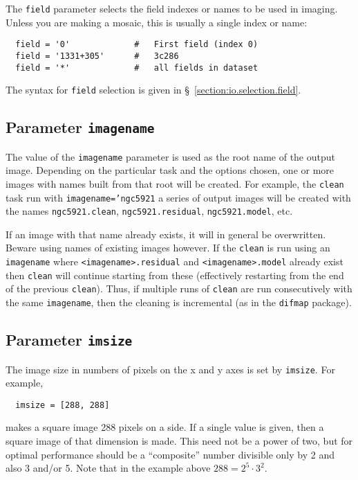 The {\tt field} parameter selects the field indexes or names
to be used in imaging.  Unless you are making a mosaic, this
is usually a single index or name:
\small
\begin{verbatim}
  field = '0'             #   First field (index 0)
  field = '1331+305'      #   3c286
  field = '*'             #   all fields in dataset
\end{verbatim}
\normalsize

The syntax for {\tt field} selection is given in 
\S~\ref{section:io.selection.field}.

\subsection{Parameter {\tt imagename} }
\label{section:im.pars.imagename}

The value of the {\tt imagename} parameter is used as the root name
of the output image.  Depending on the particular task and the
options chosen, one or more images with names built from that root
will be created.  
For example, the {\tt clean} task run with
{\tt imagename='ngc5921} 
a series of output images will be created with the names
{\tt ngc5921.clean}, {\tt ngc5921.residual}, {\tt ngc5921.model}, etc.

If an image with that name already exists, it will in general
be overwritten.  Beware using names of existing images however.
If the {\tt clean} is run using an {\tt imagename} where 
{\tt <imagename>.residual} and {\tt <imagename>.model} already
exist then {\tt clean} will continue starting from these
(effectively restarting from the end of the previous {\tt clean}). 
Thus, if multiple runs of {\tt clean} are run consecutively
with the same {\tt imagename}, then the cleaning is incremental
(as in the {\tt difmap} package).

\subsection{Parameter {\tt imsize} }
\label{section:im.pars.imsize}

The image size in numbers of pixels on the x and y axes is
set by {\tt imsize}.  For example,
\small
\begin{verbatim}
  imsize = [288, 288]
\end{verbatim}
\normalsize
makes a square image 288 pixels on a side.  If a single value
is given, then a square image of that dimension is made.  This
need not be a power of two, but for optimal performance should
be a ``composite'' number divisible only by 2 and also 3 and/or
5.  Note that in the example above $288 = 2^5 \cdot 3^2$.

